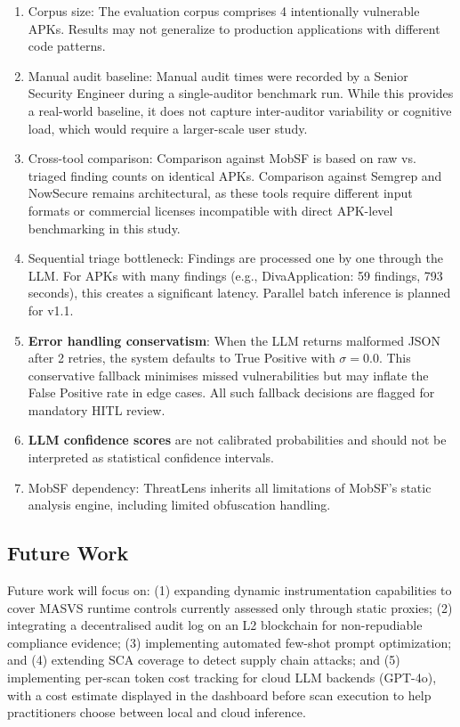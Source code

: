 \documentclass[preprint,12pt,a4paper]{elsarticle}
\begin{document}
\begin{enumerate}
\item Corpus size: The evaluation corpus comprises 4 intentionally vulnerable APKs. Results may not generalize to production applications with different code patterns.
\item Manual audit baseline: Manual audit times were recorded by a Senior Security Engineer during a single-auditor benchmark run. While this provides a real-world baseline, it does not capture inter-auditor variability or cognitive load, which would require a larger-scale user study.
\item Cross-tool comparison: Comparison against MobSF is based on raw vs. triaged finding counts on identical APKs. Comparison against Semgrep and NowSecure remains architectural, as these tools require different input formats or commercial licenses incompatible with direct APK-level benchmarking in this study.
\item Sequential triage bottleneck: Findings are processed one by one through the LLM. For APKs with many findings (e.g., DivaApplication: 59 findings, 793 seconds), this creates a significant latency. Parallel batch inference is planned for v1.1.
\item \textbf{Error handling conservatism}: When the LLM returns malformed JSON after 2 retries, the system defaults to True Positive with $\sigma = 0.0$. This conservative fallback minimises missed vulnerabilities but may inflate the False Positive rate in edge cases. All such fallback decisions are flagged for mandatory HITL review.
\item \textbf{LLM confidence scores} are not calibrated probabilities and should not be interpreted as statistical confidence intervals.
\item MobSF dependency: ThreatLens inherits all limitations of MobSF's static analysis engine, including limited obfuscation handling.
\end{enumerate}

\subsection{Future Work}

Future work will focus on: (1) expanding dynamic instrumentation capabilities to cover
MASVS runtime controls currently assessed only through static proxies; (2) integrating
a decentralised audit log on an L2 blockchain for non-repudiable compliance evidence;
(3) implementing automated few-shot prompt optimization; and (4) extending SCA coverage to detect supply chain attacks; and (5) implementing per-scan token cost tracking for cloud LLM backends (GPT-4o), with a cost estimate displayed in the dashboard before scan execution to help practitioners choose between local and cloud inference.
\end{document}
